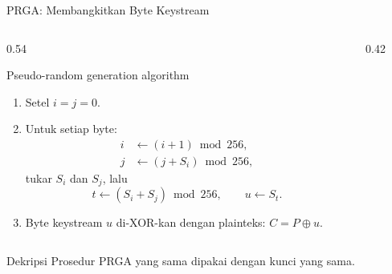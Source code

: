 \documentclass[aspectratio=169,11pt]{beamer}
\begin{document}
\begin{frame}{PRGA: Membangkitkan Byte Keystream}
    \footnotesize
    \begin{columns}[T,onlytextwidth]
        \begin{column}{0.54\textwidth}
            \begin{block}{Pseudo-random generation algorithm}
                \begin{enumerate}
                    \item Setel $i=j=0$.
                    \item Untuk setiap byte:
                          \begin{align*}
                              i&\leftarrow(i+1)\bmod 256,\\
                              j&\leftarrow(j+S_i)\bmod 256,
                          \end{align*}
                          tukar $S_i$ dan $S_j$, lalu
                          \[
                              t\leftarrow(S_i+S_j)\bmod 256,\qquad
                              u\leftarrow S_t .
                          \]
                    \item Byte keystream $u$ di-XOR-kan dengan plainteks:
                          $C=P\oplus u$.
                \end{enumerate}
            \end{block}
        \end{column}
        \begin{column}{0.42\textwidth}
            \centering
        \end{column}
    \end{columns}
    \vspace{0.05cm}
    \begin{block}{Dekripsi}
        Prosedur PRGA yang sama dipakai dengan kunci yang sama.
    \end{block}
\end{frame}
\end{document}

